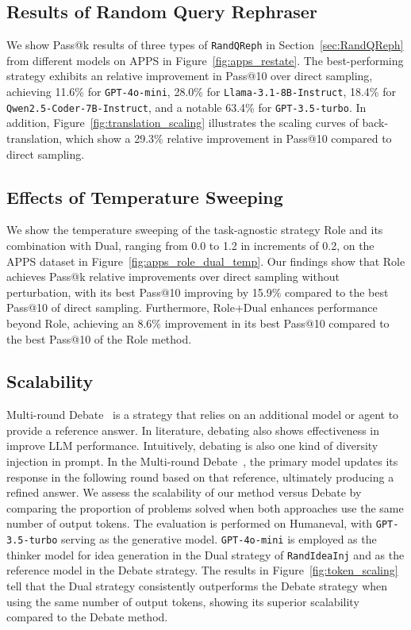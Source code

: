 

\subsection{Results of Random Query Rephraser}
We show Pass@k results of three types of \texttt{RandQReph} in Section~\ref{sec:RandQReph} from different models on APPS in Figure~\ref{fig:apps_restate}. The best-performing strategy exhibits an relative improvement in Pass@10 over direct sampling, achieving 11.6\% for \texttt{GPT-4o-mini}, 28.0\% for \texttt{Llama-3.1-8B-Instruct}, 18.4\% for \texttt{Qwen2.5-Coder-7B-Instruct}, and a notable 63.4\% for \texttt{GPT-3.5-turbo}. In addition, Figure~\ref{fig:translation_scaling} illustrates the scaling curves of back-translation, which show a 29.3\% relative improvement in Pass@10 compared to direct sampling. 


\subsection{Effects of Temperature Sweeping}
We show the temperature sweeping of the task-agnostic strategy Role and its combination with Dual, ranging from 0.0 to 1.2 in increments of 0.2, on the APPS dataset in Figure~\ref{fig:apps_role_dual_temp}. Our findings show that Role achieves Pass@k relative improvements over direct sampling without perturbation, with its best Pass@10 improving by 15.9\% compared to the best Pass@10 of direct sampling. Furthermore, Role+Dual enhances performance beyond Role, achieving an 8.6\% improvement in its best Pass@10 compared to the best Pass@10 of the Role method. 
\subsection{Scalability}
Multi-round Debate~\cite{du2023improving} is a strategy that relies on an additional model or agent to provide a reference answer. In literature, debating also shows effectiveness in improve LLM performance. Intuitively, debating is also one kind of diversity injection in prompt. In the Multi-round Debate~\cite{du2023improving}, the primary model updates its response in the following round based on that reference, ultimately producing a refined answer. We assess the scalability of our method versus Debate by comparing the proportion of problems solved when both approaches use the same number of output tokens. The evaluation is performed on Humaneval, with \texttt{GPT-3.5-turbo} serving as the generative model. \texttt{GPT-4o-mini} is employed as the thinker model for idea generation in the Dual strategy of \texttt{RandIdeaInj} and as the reference model in the Debate strategy. The results in Figure~\ref{fig:token_scaling} tell that the Dual strategy consistently outperforms the Debate strategy when using the same number of output tokens, showing its superior scalability compared to the Debate method.

